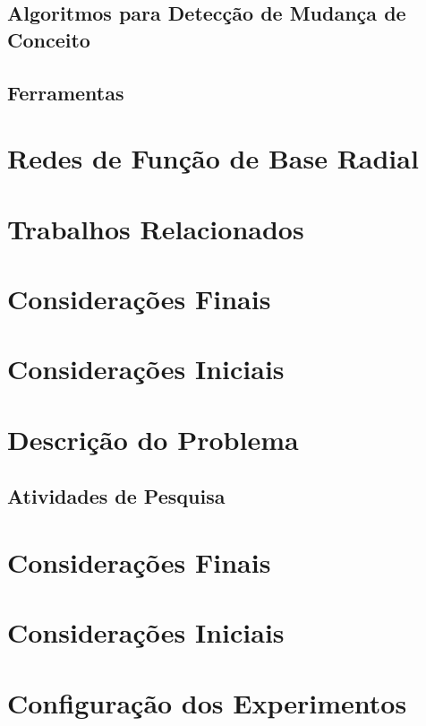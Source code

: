 \documentclass[qual, classic, a4paper]{ufbathesis}
\begin{document}
\subsection{Algoritmos para Detecção de Mudança de Conceito}
\blindtext

\subsection{Ferramentas}
\blindtext

\section{Redes de Função de Base Radial}
\blindtext
  
\section{Trabalhos Relacionados}
\blindtext

\section{Considerações Finais}
\blindtext

 \label{plano_pesquisa}
\section{Considerações Iniciais}
\blindtext

\section{Descrição do Problema}
\blindtext

\subsection{Atividades de Pesquisa}
\blindtext

\section{Considerações Finais}
\blindtext

 \label{experimentos_iniciais}
\section{Considerações Iniciais}
\blindtext

\section{Configuração dos Experimentos}
\blindtext
\end{document}
